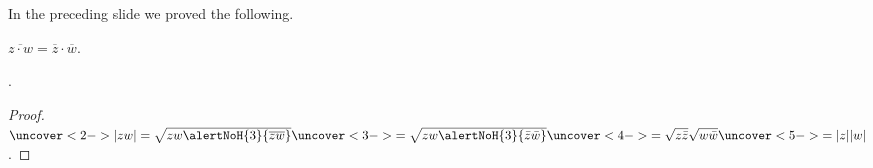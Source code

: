 \begin{frame}
In the preceding slide we proved the following.
\begin{theorem}
$\overline {z\cdot w}=\overline z\cdot \overline w$.
\end{theorem}
\begin{corollary}
.
\end{corollary}
\begin{proof}
$\uncover<2->{|zw|= \sqrt{zw \alertNoH{3}{\overline{zw}}}} \uncover<3->{= \sqrt{zw \alertNoH{3}{\bar z \bar w}} } \uncover<4->{ = \sqrt{z\bar z}\sqrt{w\bar w}} \uncover<5->{ = |z| |w|} $.
\end{proof}
\end{frame}
